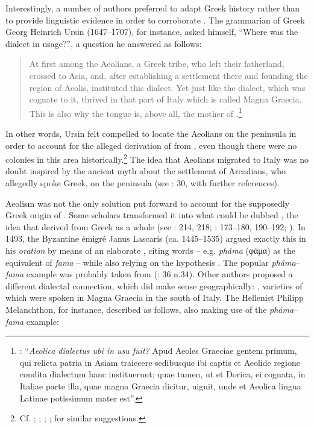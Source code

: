 Interestingly, a number of authors preferred to adapt Greek history rather than to provide linguistic evidence in order to corroborate . The grammarian of Greek Georg Heinrich Ursin (1647–1707), for instance, asked himself, “Where was the  dialect in usage?”, a question he answered as follows:

\begin{quote}
At first among the Aeolians, a Greek tribe, who left their fatherland, crossed to Asia, and, after establishing a settlement there and founding the region of Aeolis, instituted this dialect. Yet just like the  dialect, which was cognate to it,  thrived in that part of Italy which is called Magna Graecia. This is also why the  tongue is, above all, the mother of .\footnote{\citet[509]{Ursin1691}: “\textit{Aeolica dialectus ubi in usu fuit?} Apud Aeoles Graeciae gentem primum, qui relicta patria in Asiam traiecere sedibusque ibi captis et Aeolide regione condita dialectum hanc instituerunt; quae tamen, ut et Dorica, ei cognata, in Italiae parte illa, quae magna Graecia dicitur, uiguit, unde et Aeolica lingua Latinae potissimum mater est”.}
\end{quote}

In other words, Ursin felt compelled to locate the Aeolians on the  peninsula in order to account for the alleged derivation of  from , even though there were no  colonies in this area historically.\footnote{Cf. \citet[289]{[schulze]1711}; \citet[\textsc{i}.69]{Ten1723}; \citet[30]{Munthe1748}; \citet[89]{Facius1782}; \citet[199]{Ries1786} for similar suggestions.} The idea that Aeolians migrated to Italy was no doubt inspired by the ancient myth about the settlement of Arcadians, who allegedly spoke  Greek, on the peninsula (see \citealt{Lamers2019}: 30, with further references).

Aeolism was not the only solution put forward to account for the supposedly Greek origin of . Some scholars transformed it into what could be dubbed , the idea that  derived from Greek as a whole (see \citealt{Tavoni1986}: 214, 218; \citealt{Lamers2015}: 173–180, 190–192; \citeyear{Lamers2019}). In 1493, the Byzantine émigré Janus Lascaris (ca. 1445–1535) argued exactly this in his \textit{ oration} by means of an elaborate , citing  words – e.g. \textit{pháma} (φάμα) as the equivalent of  \textit{fama} – while also relying on the  hypothesis \citep[179]{Lamers2015}. The popular \textit{pháma}–\textit{fama} example was probably taken from  (\citealt{Lamers2019}: 36 n.34). Other authors proposed a different dialectal connection, which did make sense geographically: , varieties of which were spoken in Magna Graecia in the south of Italy. The  Hellenist Philipp Melanchthon, for instance, described  as follows, also making use of the \textit{pháma}–\textit{fama} example:

